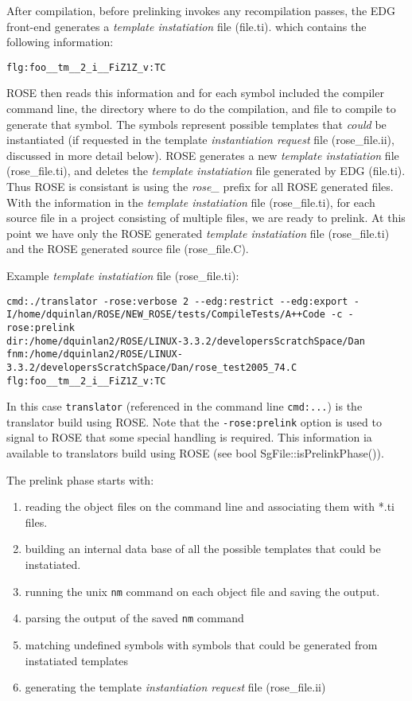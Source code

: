 {After compilation, before prelinking invokes any recompilation passes,
the EDG front-end generates a {\em template instatiation} file (file.ti).
which contains the following information:

{\indent
{\mySmallFontSize

\begin{verbatim}
flg:foo__tm__2_i__FiZ1Z_v:TC
\end{verbatim}
}}

ROSE then reads this information and for each symbol included the compiler command line,
the directory where to do the compilation, and file to compile to generate that symbol.
The symbols represent possible templates that {\em could} be instantiated (if requested 
in the template {\em instantiation request} file (rose\_file.ii), discussed in more 
detail below).  ROSE generates a new {\em template instatiation} file (rose\_file.ti),
and deletes the {\em template instatiation} file generated by EDG (file.ti).  Thus ROSE
is consistant is using the {\em rose\_} prefix for all ROSE generated files.  With
the information in the {\em template instatiation} file (rose\_file.ti), for each source
file in a project consisting of multiple files, we are ready to prelink.  At this point
we have only the ROSE generated {\em template instatiation} file (rose\_file.ti) and the
ROSE generated source file (rose\_file.C).

Example {\em template instatiation} file (rose\_file.ti):

{\indent
{\mySmallFontSize

\begin{verbatim}
cmd:./translator -rose:verbose 2 --edg:restrict --edg:export -I/home/dquinlan/ROSE/NEW_ROSE/tests/CompileTests/A++Code -c -rose:prelink
dir:/home/dquinlan2/ROSE/LINUX-3.3.2/developersScratchSpace/Dan
fnm:/home/dquinlan2/ROSE/LINUX-3.3.2/developersScratchSpace/Dan/rose_test2005_74.C
flg:foo__tm__2_i__FiZ1Z_v:TC
\end{verbatim}
}}

In this case {\tt translator} (referenced in the command line {\tt cmd:...}) is the 
translator build using ROSE. Note that the {\tt -rose:prelink} option is used to signal 
to ROSE that some special handling is required.  This information ia available to
translators build using ROSE (see bool SgFile::isPrelinkPhase()).

   The prelink phase starts with:
\begin{enumerate}
   \item reading the object files on the command line and associating them with *.ti files.  
   \item building an internal data base of all the possible templates that could be instatiated.
   \item running the unix {\tt nm} command on each object file and saving the output.
   \item parsing the output of the saved {\tt nm} command
   \item matching undefined symbols with symbols that could be generated from instatiated templates
   \item generating the template {\em instantiation request} file (rose\_file.ii)
\end{enumerate}

}
